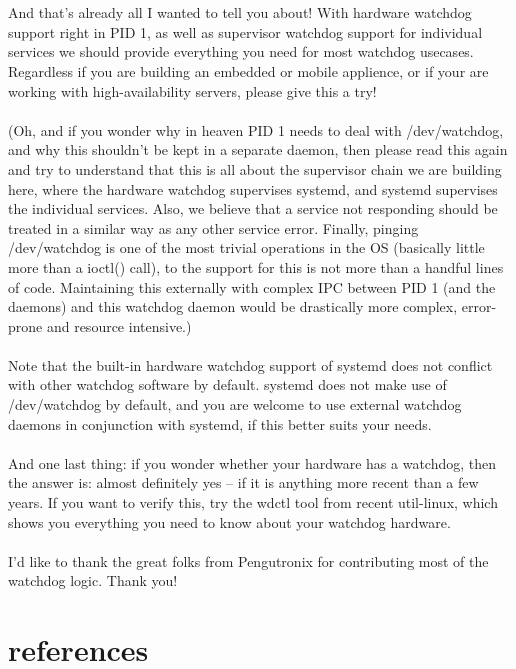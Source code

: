 \documentclass[titlepage]{article}
\begin{document}
\\
\\
And that's already all I wanted to tell you about! With hardware watchdog support right in PID 1, as well as supervisor watchdog support for individual services we should provide everything you need for most watchdog usecases. Regardless if you are building an embedded or mobile applience, or if your are working with high-availability servers, please give this a try!
\\
\\
(Oh, and if you wonder why in heaven PID 1 needs to deal with /dev/watchdog, and why this shouldn't be kept in a separate daemon, then please read this again and try to understand that this is all about the supervisor chain we are building here, where the hardware watchdog supervises systemd, and systemd supervises the individual services. Also, we believe that a service not responding should be treated in a similar way as any other service error. Finally, pinging /dev/watchdog is one of the most trivial operations in the OS (basically little more than a ioctl() call), to the support for this is not more than a handful lines of code. Maintaining this externally with complex IPC between PID 1 (and the daemons) and this watchdog daemon would be drastically more complex, error-prone and resource intensive.)
\\
\\
Note that the built-in hardware watchdog support of systemd does not conflict with other watchdog software by default. systemd does not make use of /dev/watchdog by default, and you are welcome to use external watchdog daemons in conjunction with systemd, if this better suits your needs.
\\
\\
And one last thing: if you wonder whether your hardware has a watchdog, then the answer is: almost definitely yes -- if it is anything more recent than a few years. If you want to verify this, try the wdctl tool from recent util-linux, which shows you everything you need to know about your watchdog hardware.
\\
\\
I'd like to thank the great folks from Pengutronix for contributing most of the watchdog logic. Thank you!
\section{references}
\nocite{*}


\end{document}
